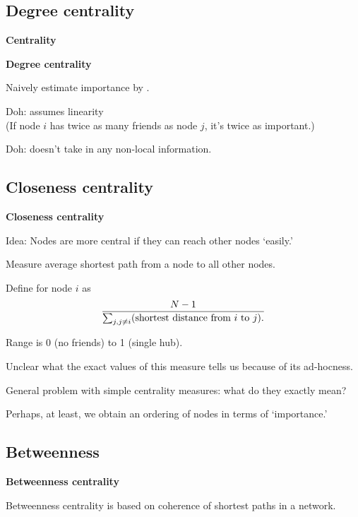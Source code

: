 \subsection{Degree centrality}

  \textbf{Centrality}

  \textbf{Degree centrality}
    
    
      Naively estimate importance by .\cite{wasserman1994a}
     
      \alert{Doh:} 
      assumes linearity\\
      (If node $i$ has twice as many friends as node $j$,
      it's twice as important.)
     
      \alert{Doh:} 
      doesn't take in any non-local information.
    
  


\subsection{Closeness centrality}

  \textbf{Closeness centrality}

  
  
    \alert{Idea:} 
    Nodes are more central if they
    can reach other nodes `easily.'
  
    Measure average shortest path
    from a node to all other nodes.
  
    Define  for node $i$ as
    $$
    \frac{N-1}
    {
      \sum_{j, j\ne i} (\textnormal{shortest distance from $i$ to $j$}).
    }
    $$
  
    Range is 0 (no friends) to 1 (single hub).
  
    Unclear what the exact values of this measure tells us because
    of its ad-hocness.
  
    General problem with simple centrality measures:
    what do they exactly mean?
  
    Perhaps, at least, we obtain an ordering
    of nodes in terms of `importance.'
  


\subsection{Betweenness}

  \textbf{Betweenness centrality}

  
   \alert{Betweenness centrality} 
    is based 
    on coherence of shortest paths in a network.
   
